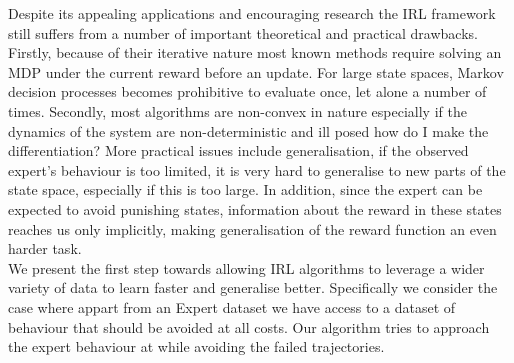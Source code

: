\documentclass[conference]{IEEEtran}
\begin{document}
Despite its appealing applications and encouraging research the IRL framework still suffers from a number of important theoretical and practical drawbacks. Firstly, because of their iterative nature most known methods require solving an MDP under the current reward before an update. For large state spaces, Markov decision processes becomes prohibitive to evaluate once, let alone a number of times. Secondly, most algorithms are non-convex in nature especially if the dynamics of the system are non-deterministic and ill posed how do I make the differentiation? More practical issues include generalisation, if the observed expert's behaviour is too limited, it is very hard to generalise to new parts of the state space, especially if this is too large. In addition, since the expert can be expected to avoid punishing states, information about the reward in these states reaches us only implicitly, making generalisation of the reward function an even harder task. \\

We present the first step towards allowing IRL algorithms to leverage a wider variety of data to learn faster and generalise better. Specifically we consider the case where appart from
an Expert dataset we have access to a dataset of behaviour that should be avoided at all costs. Our algorithm tries to approach the expert behaviour at while avoiding the failed trajectories.
\end{document}

